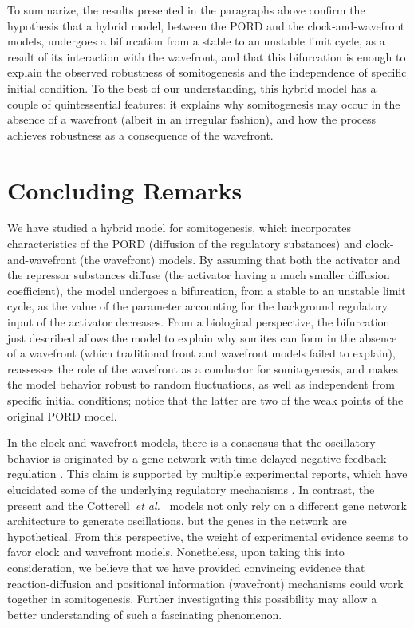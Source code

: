 \documentclass[%
 preprint,
 amsmath,amssymb,
 aps,
]{revtex4-2}
\begin{document}
	To summarize, the results presented in the paragraphs above confirm the
	hypothesis that a hybrid model, between the PORD and the clock-and-wavefront 
	models, undergoes a bifurcation from a stable to an 
	unstable limit cycle, as a result of its interaction with the
	wavefront, and
	that this bifurcation is enough to explain the observed robustness of
	somitogenesis and the independence of specific initial condition. 
	To the best of our understanding, this hybrid model has
	a couple of quintessential features: it explains why somitogenesis may occur in the 
	absence of a wavefront (albeit in an irregular fashion), and how the process 
	achieves robustness as a consequence of the wavefront.
	
	
	\section{Concluding Remarks}
	\label{conclu}
	
	We have studied a hybrid model for somitogenesis, which incorporates 
	characteristics of the PORD (diffusion of the regulatory substances) and 
	clock-and-wavefront (the wavefront) models. By assuming that both the activator 
	and the repressor substances diffuse (the activator having a much smaller 
	diffusion coefficient), the model undergoes a bifurcation, from a stable to an 
	unstable limit cycle, as the value of the parameter accounting for the background
	regulatory input of the activator decreases. From a biological perspective, the
	bifurcation just described allows the model to explain why somites can form in
	the absence of a wavefront (which traditional front and wavefront models failed
	to explain), reassesses the role of the wavefront as a conductor for
	somitogenesis, and makes the model behavior robust to random fluctuations, as 
	well as independent from specific initial conditions;
	notice that the latter are two of the weak points of the original PORD model.  
	
	In the clock and wavefront models, there is a consensus that the oscillatory
	behavior is originated by a gene network with time-delayed negative feedback
	regulation \citep{Monk2003, Lewis2003}. This claim is supported by multiple
	experimental reports, which have elucidated some of the underlying regulatory
	mechanisms \citep{Schroter2012}. In contrast, the present and the
	Cotterell~{\em et al.}~\citep{Cotterell2015} models not only rely on a different gene network
	architecture to generate oscillations, but the genes in the network are
	hypothetical. From this perspective, the weight of experimental evidence seems
	to favor clock and wavefront models. Nonetheless, upon taking this into
	consideration, we
	believe that we have provided convincing evidence that reaction-diffusion and
	positional information (wavefront) mechanisms could work together in
	somitogenesis. Further investigating this possibility may allow a better
	understanding of such a fascinating phenomenon.
	
\end{document}
